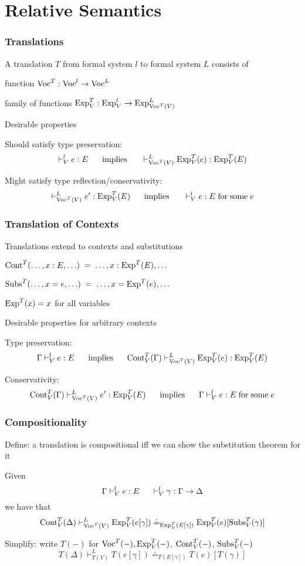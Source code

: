 \section{Relative Semantics}

\begin{frame}\frametitle{Translations}
\begin{blockitems}{A translation $T$ from formal system $l$ to formal system $L$ consists of}
\item function $\mathrm{Voc}^T:\mathrm{Voc}^l\to\mathrm{Voc}^L$
\item family of functions $\mathrm{Exp}^T_V:\mathrm{Exp}^l_V\to\mathrm{Exp}^L_{\mathrm{Voc}^T(V)}$
\end{blockitems}

\begin{blockitems}{Desirable properties}
\item Should satisfy type preservation:
\[\vdash^l_V e:E \hspace*{.5cm}\;\mathrm{implies}\;\hspace*{.5cm} \vdash^L_{\mathrm{Voc}^T(V)} \mathrm{Exp}^T_V(e):\mathrm{Exp}^T_V(E)\]
\item Might satisfy type reflection/conservativity: 
\[\vdash^L_{\mathrm{Voc}^T(V)} e':\mathrm{Exp}^T_V(E) \hspace*{.5cm}\;\mathrm{implies}\;\hspace*{.5cm} \vdash^l_V e:E \;\mathrm{for}\;\mathrm{some}\; e\]
\end{blockitems}
\end{frame}

\begin{frame}\frametitle{Translation of Contexts}
\begin{blockitems}{Translations extend to contexts and substitutions}
 \item $\mathrm{Cont}^T(\ldots,x:E,\ldots) \;=\;\ldots, x:\mathrm{Exp}^T(E), \ldots$
 \item $\mathrm{Subs}^T(\ldots,x=e,\ldots) \;=\;\ldots, x=\mathrm{Exp}^T(e), \ldots$
 \item $\mathrm{Exp}^T(x)=x$ for all variables
\end{blockitems}

\begin{blockitems}{Desirable properties for arbitrary contexts}
\item Type preservation:
\[\Gamma\vdash^l_V e:E \hspace*{.5cm}\;\mathrm{implies}\;\hspace*{.5cm} \mathrm{Cont}^T_V(\Gamma)\vdash^L_{\mathrm{Voc}^T(V)} \mathrm{Exp}^T_V(e):\mathrm{Exp}^T_V(E)\]
\item Conservativity:
\[\mathrm{Cont}^T_V(\Gamma)\vdash^L_{\mathrm{Voc}^T(V)} e':\mathrm{Exp}^T_V(E) \hspace*{.5cm}\;\mathrm{implies}\;\hspace*{.5cm} \Gamma\vdash^l_V e:E \;\mathrm{for}\;\mathrm{some}\; e\]
\end{blockitems}
\end{frame}

\begin{frame}\frametitle{Compositionality}
Define: a translation is compositional iff we can show the substitution theorem for it

Given
\[\Gamma\vdash^l_V e:E \hspace*{.5cm}\vdash^l_V \gamma:\Gamma\to\Delta\]
we have that
\[\mathrm{Cont}^T_V(\Delta)\vdash^L_{\mathrm{Voc}^T(V)}\mathrm{Exp}^T_V(e[\gamma])\doteq_{\mathrm{Exp}^T_V(E[\gamma])}\mathrm{Exp}^T_V(e)[\mathrm{Subs}^T_V(\gamma)] \]

Simplify: write
$T(-)$ for $\mathrm{Voc}^T(-), \mathrm{Exp}_V^T(-)$, $\mathrm{Cont}_V^T(-)$, $\mathrm{Subs}_V^T(-)$
\[T(\Delta)\vdash^L_{T(V)}T(e[\gamma])\doteq_{T(E[\gamma])}T(e)[T(\gamma)] \]
\end{frame}


